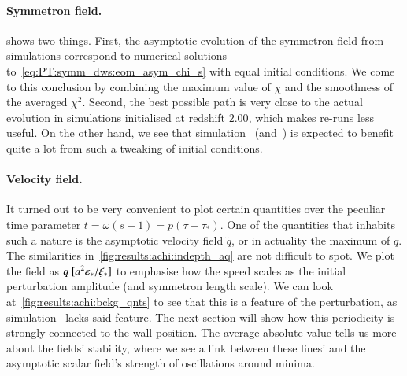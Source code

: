 \paragraph{Symmetron field.} %
 shows two things. First, the asymptotic evolution of the symmetron field from simulations correspond to numerical solutions to~\cref{eq:PT:symm_dws:eom_asym_chi_s} with equal initial conditions. We come to this conclusion by combining the maximum value of $\chi$ and the smoothness of the averaged $\chi^2$. Second, the best possible path %
is very close to the actual evolution in simulations initialised at redshift $2.00$, which makes re-runs less useful. On the other hand, we see that simulation~ (and~) is expected to benefit quite a lot from such a tweaking of initial conditions.


\paragraph{Velocity field.} %
It turned out to be very convenient to plot certain quantities over the peculiar time parameter $t = \omega(s-1)=p(\tau-\tau_\ast)$. One of the quantities that inhabits such a nature is the asymptotic velocity field $\breve{q}$, or in actuality the maximum of $q$. %
The similarities in~\cref{fig:results:achi:indepth_aq} are not difficult to spot. We plot the field as $q~[a^2 \varepsilon_\ast/\xi_\ast]$ %
to emphasise how the speed scales as the initial perturbation amplitude (and symmetron length scale). We can look at~\cref{fig:results:achi:bckg_qnts} to see that this is a feature of the perturbation, as simulation~ lacks said feature. The next section will show how this periodicity is strongly connected to the wall position. The average absolute value tells us more about the fields' stability, where we see a link between these lines' and the asymptotic scalar field's strength of oscillations around minima.






